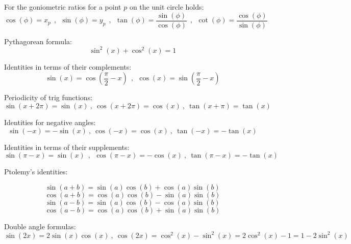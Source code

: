 For the goniometric ratios for a point $p$ on the unit circle holds:
\[
\cos(\phi)=x_p~~,~~\sin(\phi)=y_p~~,~~\tan(\phi)=\frac{\sin(\phi)}{\cos(\phi)}~~,~~\cot(\phi)=\frac{\cos(\phi)}{\sin(\phi)}
\]

Pythagorean formula:
\[
\sin^2(x)+\cos^2(x)=1 
\]

Identities in terms of their complements:
\[
\sin(x)=\cos(\frac{\pi}{2}-x) \ \ , \ \ \cos(x)=\sin(\frac{\pi}{2}-x)
\]

Periodicity of trig functions:
\[
\sin(x+2\pi)=\sin(x) \ , \ \cos(x+2\pi)=\cos(x) \ , \ \tan(x+\pi)=\tan(x)
\]

Identities for negative angles:
\[
\sin(-x) = -\sin(x) \ , \ \cos(-x) = \cos(x) \ , \ \tan(-x) = -\tan(x)
\]

Identities in terms of their supplements:
\[
\sin(\pi-x)=\sin(x) \ \ , \ \ \cos(\pi-x)=-\cos(x) \ , \ \tan(\pi-x) = -\tan(x)
\]

Ptolemy's identities:

\[
\sin(a+b)=\sin(a)\cos(b)+\cos(a)\sin(b)
\]
\[
\cos(a+b)=\cos(a)\cos(b)-\sin(a)\sin(b)
\]
\[
\sin(a-b)=\sin(a)\cos(b)-\cos(a)\sin(b)
\]
\[
\cos(a-b)=\cos(a)\cos(b)+\sin(a)\sin(b)
\]

Double angle formulas:
\[
\sin(2x) = 2\sin(x)\cos(x) \ , \ \cos(2x)=\cos^2(x)-\sin^2(x) = 2\cos^2(x)-1 = 1 - 2\sin^2(x)
\]
